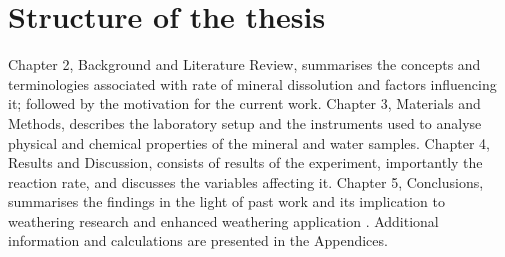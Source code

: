 \section{Structure of the thesis}
Chapter 2, Background and Literature Review, summarises the concepts and terminologies associated with rate of mineral dissolution and factors influencing it; followed by the motivation for the current work. Chapter 3, Materials and Methods, describes the laboratory setup and the instruments used to analyse physical and chemical properties of the mineral and water samples. Chapter 4, Results and Discussion, consists of results of the experiment, importantly the reaction rate, and discusses the variables affecting it. Chapter 5, Conclusions, summarises the findings in the light of past work and its implication to weathering research and enhanced weathering application . Additional information and calculations are presented in the Appendices.
